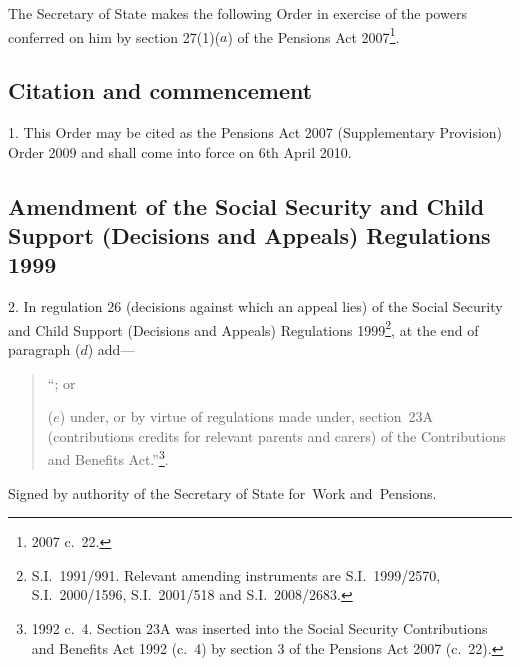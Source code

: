 \documentclass[12pt,a4paper]{article}
\title{\regstitle}
\author{S.I.\ 2009 No.\ 2715}
\date{Made
7th October 2009\\
Laid before Parliament
12th October 2009\\
Coming into force
6th April 2010
}
\begin{document}
\maketitle

\enlargethispage{\baselineskip}

\noindent
The Secretary of State makes the following Order in exercise of the powers conferred on him by section 27(1)($a$)  of the Pensions Act 2007\footnote{2007 c.~22.}. 

{\sloppy

\tableofcontents

}

\bigskip

\setcounter{secnumdepth}{-2}

\subsection[1. Citation and commencement]{Citation and commencement}

1.  This Order may be cited as the Pensions Act 2007 (Supplementary Provision) Order 2009 and shall come into force on 6th April 2010.

\subsection[2. Amendment of the Social Security and Child Support (Decisions and Appeals) Regulations 1999]{Amendment of the Social Security and Child Support (Decisions and Appeals) Regulations 1999}

2.  In regulation 26 (decisions against which an appeal lies) of the Social Security and Child Support (Decisions and Appeals) Regulations 1999\footnote{S.I.~1991/991. Relevant amending instruments are S.I.~1999/2570, S.I.~2000/1596, S.I.~2001/518 and S.I.~2008/2683.}, at the end of paragraph ($d$)  add—
\begin{quotation}
“; or

($e$) under, or by virtue of regulations made under, section~23A (contributions credits for relevant parents and carers) of the Contributions and Benefits Act.”\footnote{1992 c.~4. Section 23A was inserted into the Social Security Contributions and Benefits Act 1992 (c.~4) by section 3 of the Pensions Act 2007 (c.~22).}.
\end{quotation}

\bigskip

\pagebreak[3]

Signed 
by authority of the 
Secretary of State for~Work and~Pensions.
\end{document}
